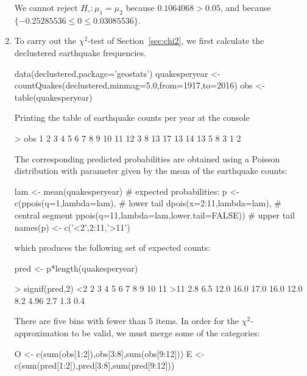 \begin{enumerate}
We cannot reject $H_\circ: \mu_1=\mu_2$ because $0.1064068>0.05$, and
because $\{-0.25285536\leq{0}\leq{0.03085536}\}$.

\item To carry out the $\chi^2$-test of Section~\ref{sec:chi2}, we
  first calculate the declustered earthquake frequencies.

\begin{script}
data(declustered,package='geostats')
quakesperyear <- countQuakes(declustered,minmag=5.0,from=1917,to=2016)
obs <- table(quakesperyear)
\end{script}

Printing the table of earthquake counts per year at the console

\begin{console}
> obs
 1  2  3  4  5  6  7  8  9 10 11 12 
 3  8 13 17 13 14 13  5  8  3  1  2 
\end{console}

The corresponding predicted probabilities are obtained using a Poisson
distribution with parameter given by the mean of the earthquake
counts:

\begin{script}[firstnumber=4]
lam <- mean(quakesperyear)
# expected probabilities:
p <- c(ppois(q=1,lambda=lam),                   # lower tail
       dpois(x=2:11,lambda=lam),                # central segment
       ppois(q=11,lambda=lam,lower.tail=FALSE)) # upper tail
names(p) <- c('<2',2:11,'>11')
\end{script}

\noindent which produces the following set of expected counts:

\begin{script}[firstnumber=10]
pred <- p*length(quakesperyear)       
\end{script}

\begin{console}
> signif(pred,2)
  <2    2    3    4    5    6    7    8     9   10   11  >11 
 2.8  6.5 12.0 16.0 17.0 16.0 12.0  8.2  4.96  2.7  1.3  0.4
\end{console}

There are five bins with fewer than 5 items. In order for the
$\chi^2$-approximation to be valid, we must merge some of the
categories:

\begin{script}[firstnumber=11]
O <- c(sum(obs[1:2]),obs[3:8],sum(obs[9:12]))
E <- c(sum(pred[1:2]),pred[3:8],sum(pred[9:12]))
\end{script}


\end{enumerate}
